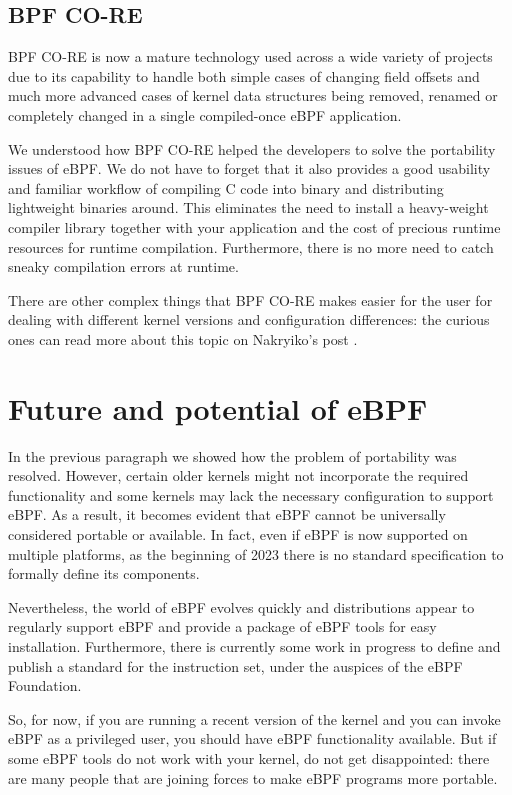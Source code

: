 \subsection{BPF CO-RE}

BPF CO-RE is now a mature technology used across a wide variety of projects due to its capability to handle both simple cases of changing field offsets and much more advanced cases of kernel data structures being removed, renamed or completely changed in a single compiled-once eBPF application.

We understood how BPF CO-RE helped the developers to solve the portability issues of eBPF.
We do not have to forget that it also provides a good usability and familiar workflow of compiling C code into binary and distributing lightweight binaries around. 
This eliminates the need to install a heavy-weight compiler library together with your application and the cost of precious runtime resources for runtime compilation. 
Furthermore, there is no more need to catch sneaky compilation errors at runtime.

There are other complex things that BPF CO-RE makes easier for the user for dealing with different kernel versions and configuration differences: the curious ones can read more about this topic on Nakryiko's post \cite{ANCOREPost}.

\section{Future and potential of eBPF}

In the previous paragraph we showed how the problem of portability was resolved.
However, certain older kernels might not incorporate the required functionality and some kernels may lack the necessary configuration to support eBPF. 
As a result, it becomes evident that eBPF cannot be universally considered portable or available.
In fact, even if eBPF is now supported on multiple platforms, as the beginning of 2023 there is no standard specification to formally define its components. 

Nevertheless, the world of eBPF evolves quickly and distributions appear to regularly support eBPF and provide a package of eBPF tools for easy installation. 
Furthermore, there is currently some work in progress to define and publish a standard for the instruction set, under the auspices of the eBPF Foundation.

So, for now, if you are running a recent version of the kernel and you can invoke eBPF as a privileged user, you should have eBPF functionality available.
But if some eBPF tools do not work with your kernel, do not get disappointed: there are many people that are joining forces to make eBPF programs more portable.

